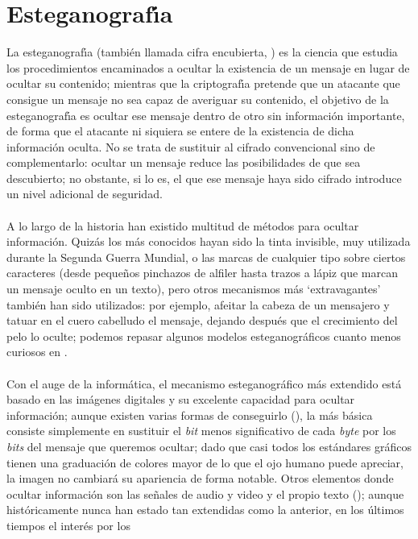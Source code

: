 \section{Esteganograf\'{\i}a}
La esteganograf\'{\i}a (tambi\'en llamada cifra encubierta, \cite{kn:cesid}) es 
la ciencia que estudia los procedimientos encaminados a ocultar la existencia 
de un mensaje en lugar de ocultar su contenido; mientras que la 
criptograf\'{\i}a pretende que un atacante que consigue un mensaje no sea capaz
de averiguar su contenido, el objetivo de la esteganograf\'{\i}a es ocultar ese
mensaje dentro de otro sin informaci\'on importante, de forma que el atacante
ni siquiera se entere de la existencia de dicha informaci\'on oculta. No se
trata de sustituir al cifrado convencional sino de complementarlo: ocultar un
mensaje reduce las posibilidades de que sea descubierto; no obstante, si lo es,
el que ese mensaje haya sido cifrado introduce un nivel adicional de
seguridad.\\
\\A lo largo de la historia han existido multitud de m\'etodos para ocultar
informaci\'on. Quiz\'as los m\'as conocidos hayan sido la tinta invisible, muy 
utilizada durante la Segunda Guerra Mundial, o las marcas de cualquier tipo 
sobre ciertos caracteres (desde peque\~nos pinchazos de alfiler hasta trazos a 
l\'apiz que marcan un mensaje oculto en un texto), pero otros mecanismos m\'as
`extravagantes' tambi\'en han sido utilizados: por ejemplo, afeitar la cabeza
de un mensajero y tatuar en el cuero cabelludo el mensaje, dejando despu\'es
que el crecimiento del pelo lo oculte; podemos repasar algunos modelos 
esteganogr\'aficos cuanto menos curiosos en \cite{kn:kah67}.\\
\\Con el auge de la inform\'atica, el mecanismo esteganogr\'afico m\'as 
extendido est\'a basado en las im\'agenes digitales y su excelente capacidad
para ocultar informaci\'on; aunque existen varias formas de conseguirlo 
(\cite{kn:schy94}), la m\'as b\'asica consiste simplemente en 
sustituir el {\it bit} menos significativo de cada {\it byte} por los {\it bits}
del mensaje que queremos ocultar; dado que casi todos los est\'andares
gr\'aficos tienen una graduaci\'on de colores mayor de lo que el ojo humano 
puede apreciar, la imagen no cambiar\'a su apariencia de forma notable. Otros
elementos donde ocultar informaci\'on son las se\~nales de audio y video y el 
propio texto (\cite{kn:ben96}); aunque hist\'oricamente nunca han estado tan 
extendidas como la anterior, en los \'ultimos tiempos el inter\'es por los
